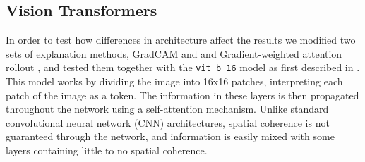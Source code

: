 \subsection{Vision Transformers}
In order to test how differences in architecture affect the results we modified two sets of explanation methods, GradCAM and and Gradient-weighted attention rollout \citep{blog-grad-rollout}, and tested them together with the \texttt{vit\_b\_16} model as first described in \citet{visual-transformer}. This model works by dividing the image into 16x16 patches, interpreting each patch of the image as a token. The information in these layers is then propagated throughout the network using a self-attention mechanism. Unlike standard convolutional neural network (CNN) architectures, spatial coherence is not guaranteed through the network, and information is easily mixed with some layers containing little to no spatial coherence.






